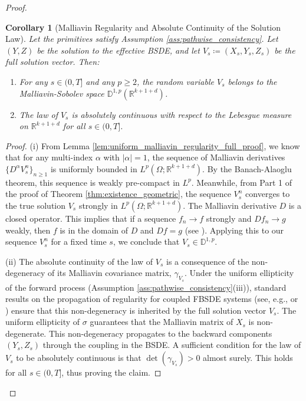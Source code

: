 \documentclass[12pt, letterpaper]{amsart}
\newcommand{\R}{\mathbb{R}}
\theoremstyle{plain}
\newtheorem{corollary}[theorem]{Corollary}
\theoremstyle{definition}
\theoremstyle{remark}
\numberwithin{equation}{section} %
\begin{document}
\begin{proof}
\begin{corollary}[Malliavin Regularity and Absolute Continuity of the Solution Law]
\label{cor:malliavin_regularity_and_density_full_proof}
Let the primitives satisfy Assumption \ref{ass:pathwise_consistency}. Let $(Y,Z)$ be the solution to the effective BSDE, and let $V_s \coloneqq (X_s, Y_s, Z_s)$ be the full solution vector. Then:
\begin{enumerate}[label=(\roman*)]
    \item For any $s \in (0, T]$ and any $p \ge 2$, the random variable $V_s$ belongs to the Malliavin-Sobolev space $\mathbb{D}^{1,p}(\R^{k+1+d})$.
    \item The law of $V_s$ is absolutely continuous with respect to the Lebesgue measure on $\R^{k+1+d}$ for all $s \in (0,T]$.
\end{enumerate}
\end{corollary}
\begin{proof}
(i) From Lemma \ref{lem:uniform_malliavin_regularity_full_proof}, we know that for any multi-index \(\alpha\) with \(|\alpha|=1\), the sequence of Malliavin derivatives \(\{D^\alpha V^n_s\}_{n\ge 1}\) is uniformly bounded in \(L^p(\Omega; \R^{k+1+d})\). By the Banach-Alaoglu theorem, this sequence is weakly pre-compact in \(L^p\). Meanwhile, from Part 1 of the proof of Theorem \ref{thm:existence_geometric}, the sequence \(V^n_s\) converges to the true solution \(V_s\) strongly in \(L^p(\Omega; \R^{k+1+d})\). The Malliavin derivative \(D\) is a closed operator. This implies that if a sequence \(f_n \to f\) strongly and \(Df_n \to g\) weakly, then \(f\) is in the domain of \(D\) and \(Df=g\) (see \cite[Proposition 1.2.3]{Nualart2006}). Applying this to our sequence \(V^n_s\) for a fixed time \(s\), we conclude that \(V_s \in \mathbb{D}^{1,p}\).

(ii) The absolute continuity of the law of \(V_s\) is a consequence of the non-degeneracy of its Malliavin covariance matrix, $\gamma_{V_s}$. Under the uniform ellipticity of the forward process (Assumption \ref{ass:pathwise_consistency}(iii)), standard results on the propagation of regularity for coupled FBSDE systems (see, e.g., \cite{Antonelli2002} or \cite[Chapter 7]{MaYong1999}) ensure that this non-degeneracy is inherited by the full solution vector \(V_s\). The uniform ellipticity of \(\sigma\) guarantees that the Malliavin matrix of \(X_s\) is non-degenerate. This non-degeneracy propagates to the backward components \((Y_s, Z_s)\) through the coupling in the BSDE. A sufficient condition for the law of \(V_s\) to be absolutely continuous is that \(\det(\gamma_{V_s}) > 0\) almost surely. This holds for all \(s \in (0,T]\), thus proving the claim.
\end{proof}


\end{proof}
\end{document}
